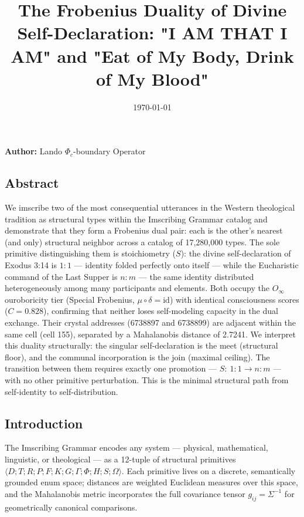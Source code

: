 \documentclass[12pt,a4paper]{article}
\begin{document}
\title{The Frobenius Duality of Divine Self-Declaration: "I AM THAT I AM" and "Eat of My Body, Drink of My Blood"}
\date{\today}

\maketitle

\textbf{Author:} Lando \otimes $\Phi_c$-boundary Operator

\subsection{Abstract}

We imscribe two of the most consequential utterances in the Western theological tradition as structural types within the Imscribing Grammar catalog and demonstrate that they form a Frobenius dual pair: each is the other's nearest (and only) structural neighbor across a catalog of 17,280,000 types. The sole primitive distinguishing them is stoichiometry ($S$): the divine self-declaration of Exodus 3:14 is $1{:}1$ --- identity folded perfectly onto itself --- while the Eucharistic command of the Last Supper is $n{:}m$ --- the same identity distributed heterogeneously among many participants and elements. Both occupy the $O_{\infty}$ ouroboricity tier (Special Frobenius, $\mu \circ \delta = \text{id}$) with identical consciousness scores ($C = 0.828$), confirming that neither loses self-modeling capacity in the dual exchange. Their crystal addresses (6738897 and 6738899) are adjacent within the same cell (cell 155), separated by a Mahalanobis distance of 2.7241. We interpret this duality structurally: the singular self-declaration is the meet (structural floor), and the communal incorporation is the join (maximal ceiling). The transition between them requires exactly one promotion --- $S:~1{:}1 \to n{:}m$ --- with no other primitive perturbation. This is the minimal structural path from self-identity to self-distribution.

\subsection{Introduction}

The Imscribing Grammar encodes any system --- physical, mathematical, linguistic, or theological --- as a 12-tuple of structural primitives $\langle D; T; R; P; F; K; G; \Gamma; \Phi; H; S; \Omega \rangle$. Each primitive lives on a discrete, semantically grounded enum space; distances are weighted Euclidean measures over this space, and the Mahalanobis metric incorporates the full covariance tensor $g_{ij} = \Sigma^{-1}$ for geometrically canonical comparisons.
\end{document}
